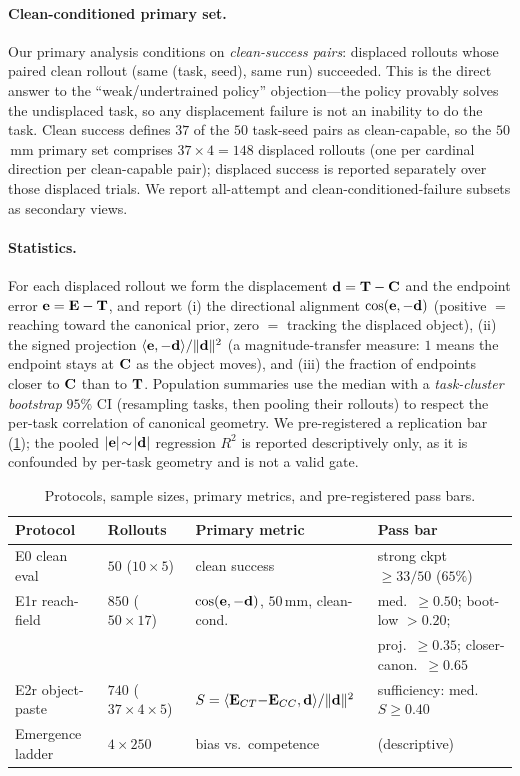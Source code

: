 \paragraph{Clean-conditioned primary set.} Our primary analysis conditions on \emph{clean-success pairs}: displaced rollouts whose paired clean rollout (same (task, seed), same run) succeeded. This is the direct answer to the ``weak/undertrained policy'' objection---the policy provably solves the undisplaced task, so any displacement failure is not an inability to do the task. Clean success defines $37$ of the $50$ task-seed pairs as clean-capable, so the $50$\,mm primary set comprises $37\times4=148$ displaced rollouts (one per cardinal direction per clean-capable pair); displaced success is reported separately over those displaced trials. We report all-attempt and clean-conditioned-failure subsets as secondary views.

\paragraph{Statistics.} For each displaced rollout we form the displacement $\mathbf{d}=\mathbf{T}-\mathbf{C}$ and the endpoint error $\mathbf{e}=\mathbf{E}-\mathbf{T}$, and report (i) the directional alignment $\operatorname{cos}(\mathbf{e},-\mathbf{d})$ (positive $=$ reaching toward the canonical prior, zero $=$ tracking the displaced object), (ii) the signed projection $\langle\mathbf{e},-\mathbf{d}\rangle/\lVert\mathbf{d}\rVert^2$ (a magnitude-transfer measure: $1$ means the endpoint stays at $\mathbf{C}$ as the object moves), and (iii) the fraction of endpoints closer to $\mathbf{C}$ than to $\mathbf{T}$. Population summaries use the median with a \emph{task-cluster bootstrap} $95\%$ CI (resampling tasks, then pooling their rollouts) to respect the per-task correlation of canonical geometry. We pre-registered a replication bar (\cref{tab:protocol}); the pooled $|\mathbf{e}|\!\sim\!|\mathbf{d}|$ regression $R^2$ is reported descriptively only, as it is confounded by per-task geometry and is not a valid gate.

\begin{table}[t]
\centering
\caption{Protocols, sample sizes, primary metrics, and pre-registered pass bars.}
\label{tab:protocol}
\small
\begin{tabular}{@{}llll@{}}
\toprule
Protocol & Rollouts & Primary metric & Pass bar \\
\midrule
E0 clean eval & $50$ ($10{\times}5$) & clean success & strong ckpt $\geq 33/50$ ($65\%$) \\
E1r reach-field & $850$ ($50{\times}17$) & $\operatorname{cos}(\mathbf{e},-\mathbf{d})$, $50$\,mm, clean-cond. & med.\ $\geq 0.50$; boot-low $>0.20$; \\
 & & & proj.\ $\geq 0.35$; closer-canon.\ $\geq 0.65$ \\
E2r object-paste & $740$ ($37{\times}4{\times}5$) & $S=\langle\mathbf{E}_{CT}{-}\mathbf{E}_{CC},\mathbf{d}\rangle/\lVert\mathbf{d}\rVert^2$ & sufficiency: med.\ $S\geq0.40$ \\
Emergence ladder & $4{\times}250$ & bias vs.\ competence & (descriptive) \\
\bottomrule
\end{tabular}
\end{table}
